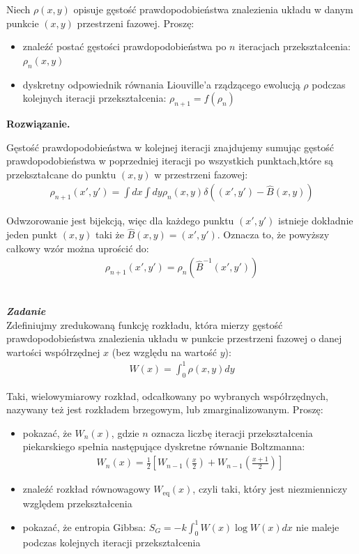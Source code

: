 \documentclass[11pt,a4paper]{article}
\newcounter{zadanie}\newcommand{\zadanie}[1][]{\addtocounter{zadanie}{1} ~\\  {\bf \emph{Zadanie \arabic{zadanie} #1 }} \\}
\newenvironment{solution}{\vspace{1cm} \par\textbf{Rozwiązanie.} \vspace{1cm}}{}
\begin{document}
Niech $\rho(x, y)$ opisuje gęstość prawdopodobieństwa znalezienia układu 
w danym punkcie $(x, y)$ przestrzeni fazowej. Proszę:
\begin{itemize}
    \item znaleźć postać gęstości prawdopodobieństwa po $n$ iteracjach 
    przekształcenia: $\rho_n(x, y)$
    \item dyskretny odpowiednik równania Liouville'a rządzącego ewolucją $\rho$ 
    podczas kolejnych iteracji przekształcenia: $\rho_{n+1} = f(\rho_n)$
\end{itemize}


\begin{solution}

Gęstość prawdopodobieństwa w kolejnej iteracji znajdujemy 
sumując gęstość prawdopodobieństwa w poprzedniej iteracji po wszystkich 
punktach,które są przekształcane do punktu $(x, y)$ w przestrzeni fazowej:
\begin{align*}
    \rho_{n+1}(x', y') = \int dx \int dy \rho_{n}(x, y) \delta((x', y') - \hat{B}(x, y))
\end{align*}

Odwzorowanie jest bijekcją, więc dla każdego punktu $(x', y')$ istnieje 
dokładnie jeden punkt $(x, y)$ taki że $\hat{B}(x, y) = (x', y')$. Oznacza to, że powyższy całkowy wzór można uprościć do:
\begin{align*}
    \rho_{n+1}(x', y') = \rho_n(\hat{B}^{-1}(x', y'))
\end{align*}

\newpage
\end{solution}
\zadanie[]
Zdefiniujmy zredukowaną funkcję rozkładu, która mierzy gęstość 
prawdopodobieństwa znalezienia układu w punkcie przestrzeni fazowej 
o danej wartości współrzędnej $x$ (bez względu na wartość $y$):
\begin{align*}
W(x) = \int_0^1 \rho(x, y)dy
\end{align*}

Taki, wielowymiarowy rozkład, odcałkowany po wybranych współrzędnych,
nazywany też jest rozkładem brzegowym, lub zmarginalizowanym. Proszę:
\begin{itemize}
    \item pokazać, że $W_n(x)$, gdzie $n$ oznacza liczbę iteracji przekształcenia 
    piekarskiego spełnia następujące dyskretne równanie Boltzmanna:
\begin{align*}
W_n(x) = \frac{1}{2}\left[W_{n-1}\left(\frac{x}{2}\right) + W_{n-1}\left(\frac{x+1}{2}\right)\right]
\end{align*}
\item znaleźć rozkład równowagowy $W_{\text{eq}}(x)$, czyli taki, który 
      jest niezmienniczy względem przekształcenia
\item pokazać, że entropia Gibbsa: $S_G = -k\int_0^1 W(x)\log W(x)dx$ 
      nie maleje podczas kolejnych iteracji przekształcenia
\end{itemize}
\end{document}
